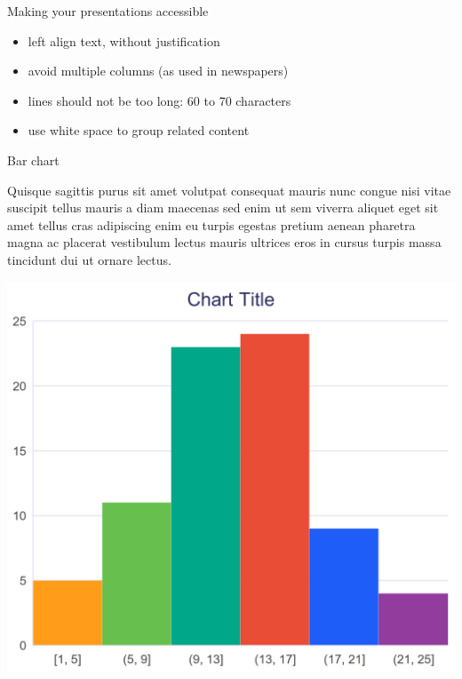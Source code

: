 \documentclass[aspectratio=169, 12pt]{beamer} %
\begin{document}
  \begin{frame}[t]{Making your presentations accessible}
    \begin{itemize}
      \item left align text, without justification
      \item avoid multiple columns (as used in newspapers)
      \item lines should not be too long: 60 to 70 characters
      \item use white space to group related content
    \end{itemize}
  \end{frame}

  \begin{frame}{Bar chart}
      \begin{minipage}[l]{0.47\textwidth}
        \raggedright
        Quisque sagittis purus sit amet volutpat consequat mauris nunc congue nisi vitae suscipit tellus mauris a diam maecenas sed enim ut sem viverra aliquet eget sit amet tellus cras adipiscing enim eu turpis egestas pretium aenean pharetra magna ac placerat vestibulum lectus mauris ultrices eros in cursus turpis massa tincidunt dui ut ornare lectus.
      \end{minipage}
      \hfill
      \begin{minipage}{0.5\textwidth}
        \centering
        \includegraphics[width=\textwidth]{bar_chart}
      \end{minipage}
  \end{frame}
\end{document}
